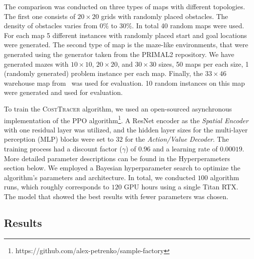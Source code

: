 \documentclass[letterpaper]{article} %
\begin{document}
The comparison was conducted on three types of maps with different topologies. The first one consists of $20\times20$ grids with randomly placed obstacles. The density of obstacles varies from $0\%$ to $30\%$. In total 40 random maps were used. For each map 5 different instances with randomly placed start and goal locations were generated. The second type of map is the maze-like environments, that were generated using the generator taken from the PRIMAL2 repository. We have generated mazes with $10\times10$, $20\times20$, and $30\times30$ sizes, 50 maps per each size, 1 (randomly generated) problem instance per each map. Finally, the $33 \times 46$ warehouse map from~\cite{li2021lifelong} was used for evaluation. 10 random instances on this map were generated and used for evaluation.



To train the \textsc{CostTracer} algorithm, we used an open-sourced asynchronous implementation of the PPO algorithm\footnote{https://github.com/alex-petrenko/sample-factory}. A ResNet encoder as the \textit{Spatial Encoder} with one residual layer was utilized, and the hidden layer sizes for the multi-layer perception (MLP) blocks were set to $32$ for the \textit{Action/Value Decoder}. The training process had a discount factor ($\gamma$) of $0.96$ and a learning rate of $0.00019$. More detailed parameter descriptions can be found in the Hyperperameters section below. 
We employed a Bayesian hyperparameter search to optimize the algorithm's parameters and architecture. In total, we conducted $100$ algorithm runs, which roughly corresponds to $120$ GPU hours using a single Titan RTX. The model that showed the best results with fewer parameters was chosen. 

\subsection{Results}
\end{document}
